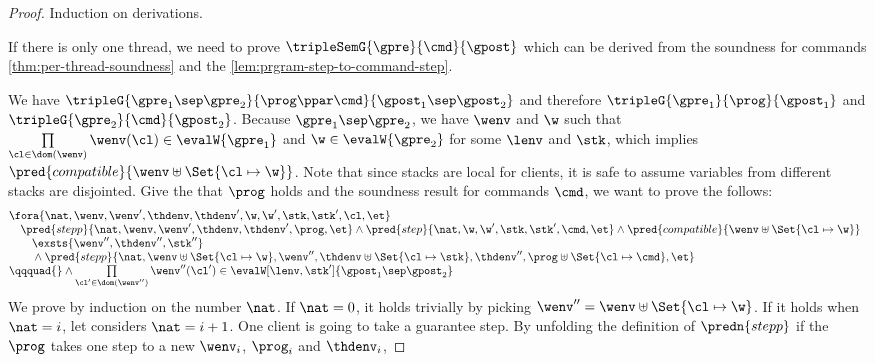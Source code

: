 \begin{proof}
Induction on derivations.

\caseB{\( \dom(\prog) = \Set{\txid \mapsto \cmd} \)}
 
If there is only one thread, we need to prove \( \tripleSemG{\gpre}{\cmd}{\gpost}\) which can be derived from the soundness for commands \cref{thm:per-thread-soundness} and the \cref{lem:prgram-step-to-command-step}.

\caseI{\( \prog \ppar \cmd \)}

We have \( \tripleG{\gpre_{1} \sep \gpre_{2}}{\prog \ppar \cmd}{ \gpost_{1} \sep \gpost_{2} } \) and therefore \( \tripleG{\gpre_{1}}{\prog}{ \gpost_{1} } \) and \( \tripleG{\gpre_{2}}{\cmd}{ \gpost_{2} } \).
Because \( \gpre_{1} \sep \gpre_{2} \), we have \( \wenv\) and \( \w \) such that \( \prod\limits_{\cl \in \dom(\wenv)} \wenv(\cl) \in \evalW{\gpre_{1}} \) and \( \w \in \evalW{\gpre_{2}}\) for some \( \lenv\) and \( \stk \), which implies \( \pred{compatible}{\wenv \uplus \Set{\cl \mapsto \w}}\).
Note that since stacks are local for clients, it is safe to assume variables from different stacks are disjointed.
Give the \ih that \( \prog \) holds and the soundness result for commands \( \cmd \), we want to prove the follows:
\[
\begin{array}{@{}l}
    \fora{\nat, \wenv, \wenv', \thdenv, \thdenv', \w, \w', \stk, \stk', \cl, \et}  \\
    \quad \pred{stepp}{\nat, \wenv, \wenv', \thdenv, \thdenv', \prog, \et} 
    \land \pred{step}{\nat, \w, \w', \stk, \stk', \cmd, \et} 
    \land \pred{compatible}{\wenv \uplus \Set{\cl \mapsto \w}} \\
    \qquad \exsts{\wenv'', \thdenv'', \stk'' } \\
    \qquad {} \land \pred{stepp}{\nat, \wenv \uplus \Set{\cl \mapsto \w}, \wenv'', \thdenv \uplus \Set{\cl \mapsto \stk}, \thdenv'', \prog \uplus \Set{\cl \mapsto \cmd}, \et}  \\
    \qqquad {} \land \prod\limits_{\cl' \in \dom(\wenv'') } \wenv''(\cl')  \in \evalW[\lenv, \stk']{\gpost_{1} \sep \gpost_{2}}
\end{array}
\]
We prove by induction on the number \( \nat \).
If \( \nat = 0\), it holds trivially by picking \( \wenv'' = \wenv \uplus \Set{\cl \mapsto \w} \).
If it holds when \( \nat = i\), let considers \( \nat = i + 1\).
One client is going to take a guarantee step.
By unfolding the definition of \( \predn{stepp} \) if the \( \prog \) takes one step to a new \( \wenv_i\), \( \prog_i \) and \( \thdenv_i \),

\end{proof}
